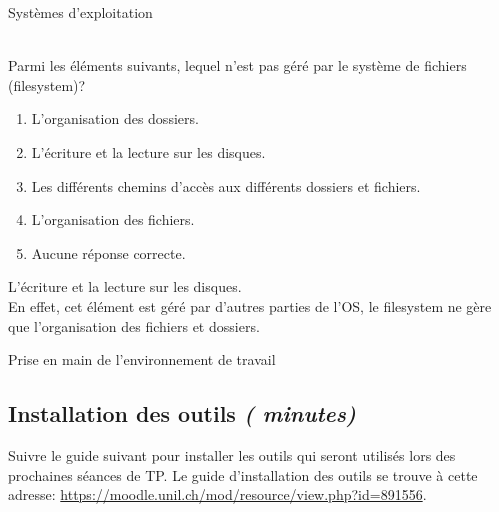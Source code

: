 \begin{section}{Systèmes d'exploitation}
    
    
     \begin{Exercice}[5 minutes]\\
    Parmi les éléments suivants, lequel n'est pas géré par le système de fichiers (filesystem)?
        \begin{enumerate}
            \item L'organisation des dossiers.
            \item L'écriture et la lecture sur les disques.
            \item Les différents chemins d'accès aux différents dossiers et fichiers.
            \item L'organisation des fichiers.
            \item Aucune réponse correcte.
        \end{enumerate}
    \end{Exercice}
    
    \begin{solution}
        L'écriture et la lecture sur les disques. \\
	
	En effet, cet élément est géré par d'autres parties de l'OS, le filesystem ne gère que l'organisation des fichiers et dossiers. \\ 
    \end{solution}
    
\end{section}
\begin{section}{Prise en main de l'environnement de travail}
    \subsection{Installation des outils \textit{(\faClock {} minutes)}} 
        Suivre le guide suivant pour installer les outils qui seront utilisés lors des prochaines séances de TP. Le guide d'installation des outils se trouve à cette adresse: \url{https://moodle.unil.ch/mod/resource/view.php?id=891556}.
\end{section}
